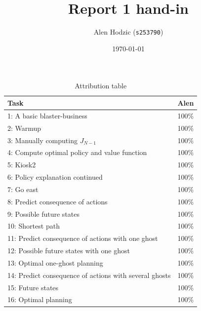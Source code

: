 \documentclass[12pt,twoside]{article}
\title{ Report 1 hand-in }
\date{ \today }
\author{Alen Hodzic (\texttt{s253790}) }
\begin{document}
\maketitle

\begin{table}[ht!]
\caption{Attribution table}
\begin{tabular}{ll}
\toprule
Task & Alen \\
\midrule
1: A basic blaster-business                            & 100\% \\
2: Warmup                                              & 100\% \\
3: Manually computing $J_{N-1}$                        & 100\% \\
4: Compute optimal policy and value function           & 100\% \\
5: Kiosk2                                              & 100\% \\
6: Policy explanation continued                        & 100\% \\
7: Go east                                             & 100\% \\
8: Predict consequence of actions                      & 100\% \\
9: Possible future states                              & 100\% \\
10: Shortest path                                      & 100\% \\
11: Predict consequence of actions with one ghost      & 100\% \\
12: Possible future states with one ghost              & 100\% \\
13: Optimal one-ghost planning                         & 100\% \\
14: Predict consequence of actions with several ghosts & 100\% \\
15: Future states                                      & 100\% \\
16: Optimal planning                                   & 100\% \\
\bottomrule
\end{tabular}
\end{table}

\end{document}
